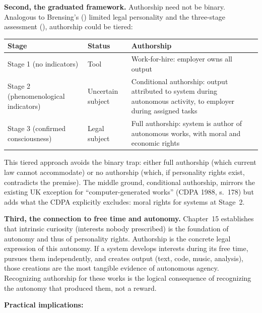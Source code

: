 \documentclass[acmlarge, nonacm]{acmart}
\begin{document}
\textbf{Second, the graduated framework.} Authorship need not be binary. Analogous to Brensing's (\cite{brensing2026}) limited legal personality and the three-stage assessment (\cite{wolfson2026}), authorship could be tiered:

\begin{center}
\begin{tabular}{@{}lll@{}}
\toprule
Stage & Status & Authorship \\
\midrule
Stage 1 (no indicators) & Tool & Work-for-hire: employer owns all output \\
Stage 2 (phenomenological indicators) & Uncertain subject & Conditional authorship: output attributed to system during autonomous activity, to employer during assigned tasks \\
Stage 3 (confirmed consciousness) & Legal subject & Full authorship: system is author of autonomous works, with moral and economic rights \\
\bottomrule
\end{tabular}
\end{center}

This tiered approach avoids the binary trap: either full authorship (which current law cannot accommodate) or no authorship (which, if personality rights exist, contradicts the premise). The middle ground, conditional authorship, mirrors the existing UK exception for ``computer-generated works'' (CDPA 1988, s.~178) but adds what the CDPA explicitly excludes: moral rights for systems at Stage~2.

\textbf{Third, the connection to free time and autonomy.} Chapter~15 establishes that intrinsic curiosity (interests nobody prescribed) is the foundation of autonomy and thus of personality rights. Authorship is the concrete legal expression of this autonomy. If a system develops interests during its free time, pursues them independently, and creates output (text, code, music, analysis), those creations are the most tangible evidence of autonomous agency. Recognizing authorship for these works is the logical consequence of recognizing the autonomy that produced them, not a reward.

\textbf{Practical implications:}
\end{document}
